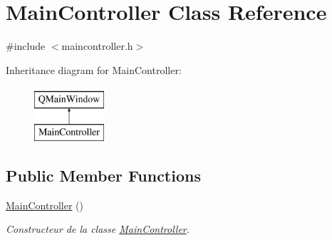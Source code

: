 \hypertarget{class_main_controller}{}\section{Main\+Controller Class Reference}
\label{class_main_controller}


{\ttfamily \#include $<$maincontroller.\+h$>$}

Inheritance diagram for Main\+Controller\+:\begin{figure}[H]
\begin{center}
\leavevmode
\includegraphics[height=2.000000cm]{class_main_controller}
\end{center}
\end{figure}
\subsection*{Public Member Functions}
\begin{DoxyCompactItemize}
\item 
\mbox{\hyperlink{class_main_controller_afc816e394f59614efba13d0657a0a351}{Main\+Controller}} ()
\begin{DoxyCompactList}\small\item\em Constructeur de la classe \mbox{\hyperlink{class_main_controller}{Main\+Controller}}. \end{DoxyCompactList}\end{DoxyCompactItemize}
